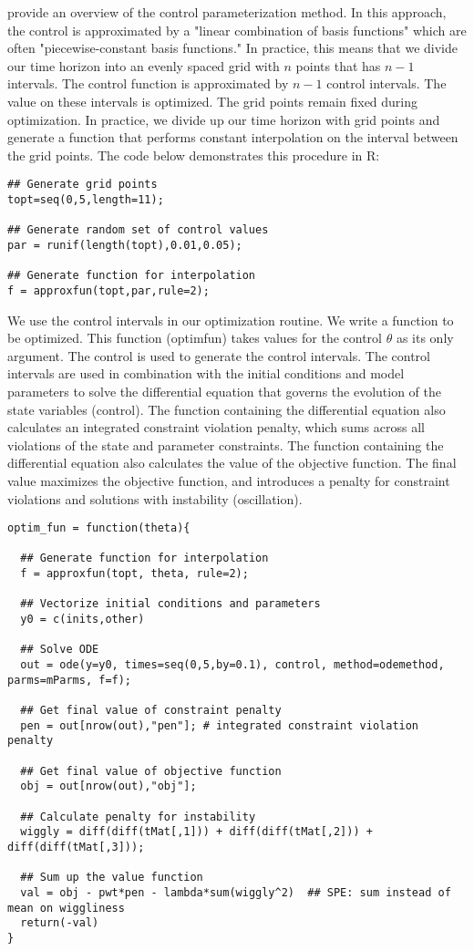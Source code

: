 \documentclass[12pt, oneside]{article}   	%
\begin{document}
\cite{lin2014} provide an overview of the control parameterization method. In this approach, the control is approximated by a "linear combination of basis functions" which are often "piecewise-constant basis functions." In practice, this means that we divide our time horizon into an evenly spaced grid with $n$ points that has $n-1$ intervals. The control function is approximated by $n-1$ control intervals. The value on these intervals is optimized. The grid points remain fixed during optimization. In practice, we divide up our time horizon with grid points and generate a function that performs constant interpolation on the interval between the grid points. The code below demonstrates this procedure in R:

\begin{lstlisting}
## Generate grid points
topt=seq(0,5,length=11); 

## Generate random set of control values
par = runif(length(topt),0.01,0.05); 

## Generate function for interpolation
f = approxfun(topt,par,rule=2);
\end{lstlisting}

We use the control intervals in our optimization routine. We write a function to be optimized. This function (optimfun) takes values for the control $\theta$ as its only argument. The control is used to generate the control intervals. The control intervals are used in combination with the initial conditions and model parameters to solve the differential equation that governs the evolution of the state variables (control). The function containing the differential equation also calculates an integrated constraint violation penalty, which sums across all violations of the state and parameter constraints. The function containing the differential equation also calculates the value of the objective function. The final value maximizes the objective function, and introduces a penalty for constraint violations and solutions with instability (oscillation).

\begin{lstlisting}
optim_fun = function(theta){
  
  ## Generate function for interpolation
  f = approxfun(topt, theta, rule=2);
  
  ## Vectorize initial conditions and parameters
  y0 = c(inits,other) 
  
  ## Solve ODE
  out = ode(y=y0, times=seq(0,5,by=0.1), control, method=odemethod, parms=mParms, f=f);
  
  ## Get final value of constraint penalty
  pen = out[nrow(out),"pen"]; # integrated constraint violation penalty 
  
  ## Get final value of objective function
  obj = out[nrow(out),"obj"]; 
  
  ## Calculate penalty for instability
  wiggly = diff(diff(tMat[,1])) + diff(diff(tMat[,2])) + diff(diff(tMat[,3])); 
  
  ## Sum up the value function
  val = obj - pwt*pen - lambda*sum(wiggly^2)  ## SPE: sum instead of mean on wiggliness
  return(-val)
}
\end{lstlisting}
\end{document}
